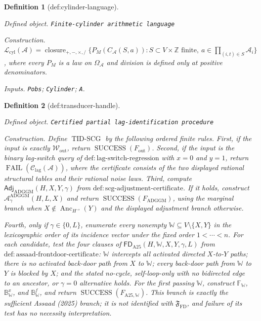 \documentclass{article}
\newtheorem{definition}{Definition}
\begin{document}
\begin{definition}[def:cylinder-language]\label{def:cylinder-language}
\par\smallskip\noindent\emph{Defined object.} \texttt{Finite-\allowbreak{}cylinder arithmetic language}
\par\smallskip\noindent\emph{Construction.} \(\mathcal L_{\mathrm{cyl}}(\mathcal A)=\operatorname{closure}_{+,-,\times,/}\{P_M(C_{\mathcal A}(S,a)):S\subset V\times\mathbb Z\text{ finite},\ a\in\prod_{(i,t)\in S}\mathcal A_i\}\), where every \(P_M\) is a law on \(\Omega_{\mathcal A}\) and division is defined only at positive denominators.
\par\smallskip\noindent\emph{Inputs.} \texttt{Pobs}; \texttt{Cylinder}; \texttt{A}.
\end{definition}

\begin{definition}[def:transducer-handle]\label{def:transducer-handle}
\par\smallskip\noindent\emph{Defined object.} \texttt{Certified partial lag-\allowbreak{}identification procedure}
\par\smallskip\noindent\emph{Construction.} Define \(\operatorname{TID\text{-}SCG}\) by the following ordered finite rules.  First, if the input is exactly \(\mathcal W_{\mathrm{out}}\), return \(\operatorname{SUCCESS}(F_{\mathrm{out}})\).  Second, if the input is the binary lag-switch query of \(\mathrm{def:lag\text{-}switch\text{-}regression}\) with \(x=0\) and \(y=1\), return \(\operatorname{FAIL}(\mathcal C_{\mathrm{lag}}(\mathcal A))\), where the certificate consists of the two displayed rational structural tables and their rational noise laws.  Third, compute \(\mathsf{Adj}_{\mathrm{ADGGM}}(H,X,Y,\gamma)\) from \(\mathrm{def:scg\text{-}adjustment\text{-}certificate}\).  If it holds, construct \(\mathcal A_{\gamma}^{\mathrm{ADGGM}}(H,L,X)\) and return \(\operatorname{SUCCESS}(F_{\mathrm{ADGGM}})\), using the marginal branch when \(X\notin\operatorname{Anc}_{H^{\to}}(Y)\) and the displayed adjustment branch otherwise.

Fourth, only if \(\gamma\in\{0,L\}\), enumerate every nonempty \(\mathbb W\subseteq V\setminus\{X,Y\}\) in the lexicographic order of its incidence vector under the fixed order \(1<\cdots<n\).  For each candidate, test the four clauses of \(\mathsf{FD}_{\mathrm{A25}}(H,\mathbb W,X,Y,\gamma,L)\) from \(\mathrm{def:assaad\text{-}frontdoor\text{-}certificate}\): \(\mathbb W\) intercepts all activated directed \(X\)-to-\(Y\) paths; there is no activated back-door path from \(X\) to \(\mathbb W\); every back-door path from \(\mathbb W\) to \(Y\) is blocked by \(X\); and the stated no-cycle, self-loop-only with no bidirected edge to an ancestor, or \(\gamma=0\) alternative holds.  For the first passing \(\mathbb W\), construct \(\mathbb F_{\mathbb W}\), \(\mathbb B^x_{\mathbb W}\), and \(\mathbb B^f_{\mathbb W}\), and return \(\operatorname{SUCCESS}(F_{\mathrm{A25},\mathbb W})\).  This branch is exactly the sufficient Assaad (2025) branch; it is not identified with \(\mathfrak F_{\mathrm{FD}}\), and failure of its test has no necessity interpretation.


\end{definition}
\end{document}
